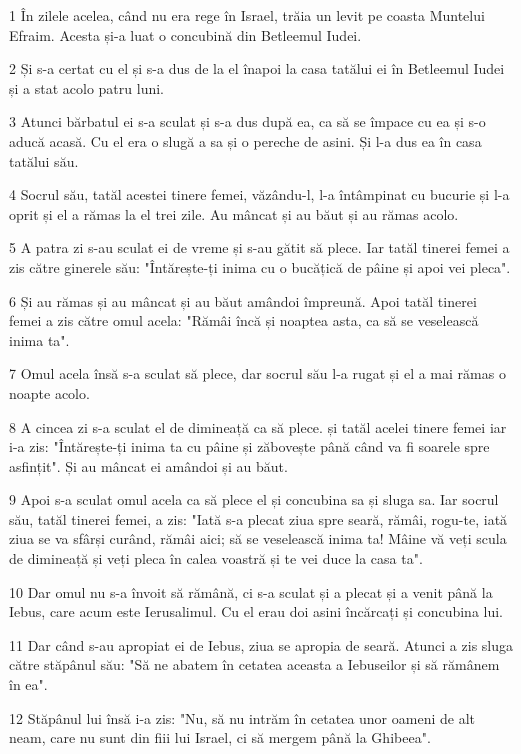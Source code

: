 \par 1 În zilele acelea, când nu era rege în Israel, trăia un levit pe coasta Muntelui Efraim. Acesta și-a luat o concubină din Betleemul Iudei.
\par 2 Și s-a certat cu el și s-a dus de la el înapoi la casa tatălui ei în Betleemul Iudei și a stat acolo patru luni.
\par 3 Atunci bărbatul ei s-a sculat și s-a dus după ea, ca să se împace cu ea și s-o aducă acasă. Cu el era o slugă a sa și o pereche de asini. Și l-a dus ea în casa tatălui său.
\par 4 Socrul său, tatăl acestei tinere femei, văzându-l, l-a întâmpinat cu bucurie și l-a oprit și el a rămas la el trei zile. Au mâncat și au băut și au rămas acolo.
\par 5 A patra zi s-au sculat ei de vreme și s-au gătit să plece. Iar tatăl tinerei femei a zis către ginerele său: "Întărește-ți inima cu o bucățică de pâine și apoi vei pleca".
\par 6 Și au rămas și au mâncat și au băut amândoi împreună. Apoi tatăl tinerei femei a zis către omul acela: "Rămâi încă și noaptea asta, ca să se veselească inima ta".
\par 7 Omul acela însă s-a sculat să plece, dar socrul său l-a rugat și el a mai rămas o noapte acolo.
\par 8 A cincea zi s-a sculat el de dimineață ca să plece. și tatăl acelei tinere femei iar i-a zis: "Întărește-ți inima ta cu pâine și zăbovește până când va fi soarele spre asfințit". Și au mâncat ei amândoi și au băut.
\par 9 Apoi s-a sculat omul acela ca să plece el și concubina sa și sluga sa. Iar socrul său, tatăl tinerei femei, a zis: "Iată s-a plecat ziua spre seară, rămâi, rogu-te, iată ziua se va sfârși curând, rămâi aici; să se veselească inima ta! Mâine vă veți scula de dimineață și veți pleca în calea voastră și te vei duce la casa ta".
\par 10 Dar omul nu s-a învoit să rămână, ci s-a sculat și a plecat și a venit până la Iebus, care acum este Ierusalimul. Cu el erau doi asini încărcați și concubina lui.
\par 11 Dar când s-au apropiat ei de Iebus, ziua se apropia de seară. Atunci a zis sluga către stăpânul său: "Să ne abatem în cetatea aceasta a Iebuseilor și să rămânem în ea".
\par 12 Stăpânul lui însă i-a zis: "Nu, să nu intrăm în cetatea unor oameni de alt neam, care nu sunt din fiii lui Israel, ci să mergem până la Ghibeea".
